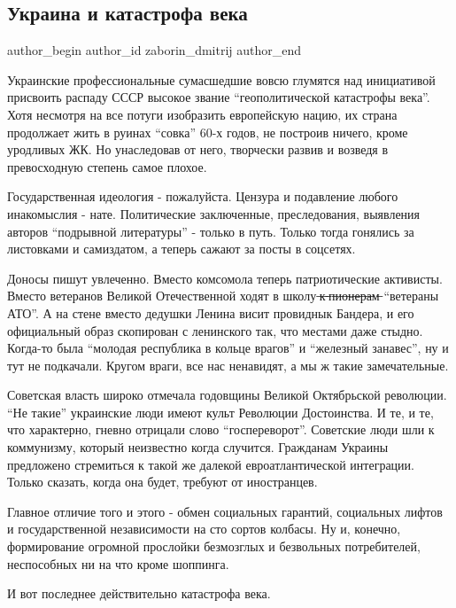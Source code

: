  
 
 
 
 
 
\subsection{Украина и катастрофа века}
\label{sec:22_12_2021.fb.zaborin_dmitrij.1.ukraina_katastrofa_veka}
 
\ifcmt
 author_begin
   author_id zaborin_dmitrij
 author_end
\fi

Украинские профессиональные сумасшедшие вовсю глумятся над инициативой
присвоить распаду СССР высокое звание \enquote{геополитической катастрофы века}. Хотя
несмотря на все потуги изобразить европейскую нацию, их страна продолжает жить
в руинах \enquote{совка} 60-х годов, не построив ничего, кроме уродливых ЖК. Но
унаследовав от него, творчески развив и возведя в превосходную степень самое
плохое. 


Государственная идеология - пожалуйста. Цензура и подавление любого инакомыслия
- нате. Политические заключенные, преследования, выявления авторов \enquote{подрывной
литературы} - только в путь. Только тогда гонялись за листовками и самиздатом,
а теперь сажают за посты в соцсетях.

Доносы пишут увлеченно. Вместо комсомола теперь патриотические активисты.
Вместо ветеранов Великой Отечественной ходят в школу ̶к̶ ̶п̶и̶о̶н̶е̶р̶а̶м̶ \enquote{ветераны АТО}.
А на стене вместо дедушки Ленина висит провиднык Бандера, и его официальный
образ скопирован с ленинского так, что местами даже стыдно. Когда-то была
\enquote{молодая республика в кольце врагов} и \enquote{железный занавес}, ну и тут не
подкачали. Кругом враги, все нас ненавидят, а мы ж такие замечательные. 

Советская власть широко отмечала годовщины Великой Октябрьской революции. \enquote{Не
такие} украинские люди имеют культ Революции Достоинства. И те, и те, что
характерно, гневно отрицали слово \enquote{госпереворот}. Советские люди шли к
коммунизму, который неизвестно когда случится. Гражданам Украины предложено
стремиться к такой же далекой евроатлантической интеграции. Только сказать,
когда она будет, требуют от иностранцев. 

Главное отличие того и этого - обмен социальных гарантий, социальных лифтов и
государственной независимости на сто сортов колбасы. Ну и, конечно,
формирование огромной прослойки безмозглых и безвольных потребителей,
неспособных ни на что кроме шоппинга. 

И вот последнее действительно катастрофа века.

